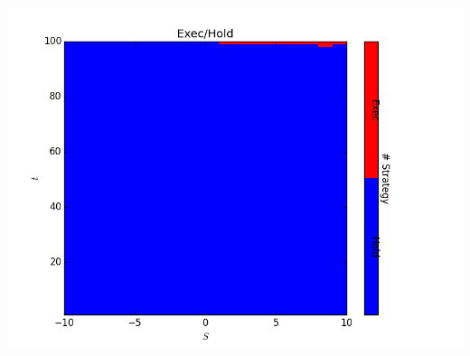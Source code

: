 \documentclass[12pt]{article}
\begin{document}
\begin{itemize}
    \includegraphics[scale=1.]{control.png}
\end{itemize}
\end{document}
